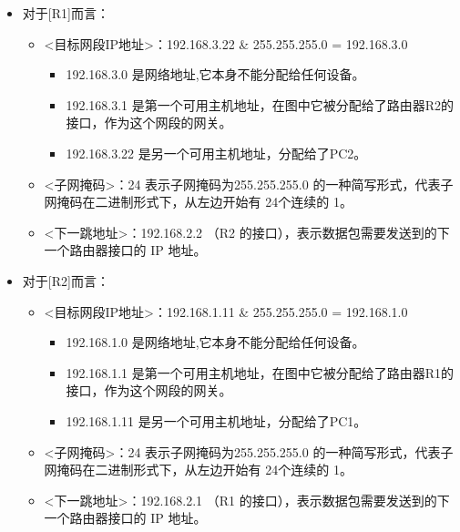 \documentclass[a4paper]{article}
\begin{document}
\begin{itemize}
    \item 对于[R1]而言：
    \begin{itemize}
        \item <目标网段IP地址>：192.168.3.22 \& 255.255.255.0 = 192.168.3.0
        \begin{itemize}
            \item 192.168.3.0 是网络地址,它本身不能分配给任何设备。
            \item 192.168.3.1 是第一个可用主机地址，在图中它被分配给了路由器R2的接口，作为这个网段的网关。
            \item 192.168.3.22 是另一个可用主机地址，分配给了PC2。
        \end{itemize}
        \item <子网掩码>：24 表示子网掩码为255.255.255.0 的一种简写形式，代表子网掩码在二进制形式下，从左边开始有 24个连续的 1。
        \item <下一跳地址>：192.168.2.2 （R2 的接口），表示数据包需要发送到的下一个路由器接口的 IP 地址。
    \end{itemize}
\end{itemize}   

\begin{itemize}
    \item 对于[R2]而言：
    \begin{itemize}
        \item <目标网段IP地址>：192.168.1.11 \& 255.255.255.0 = 192.168.1.0
        \begin{itemize}
            \item 192.168.1.0 是网络地址,它本身不能分配给任何设备。
            \item 192.168.1.1 是第一个可用主机地址，在图中它被分配给了路由器R1的接口，作为这个网段的网关。
            \item 192.168.1.11 是另一个可用主机地址，分配给了PC1。
        \end{itemize}
        \item <子网掩码>：24 表示子网掩码为255.255.255.0 的一种简写形式，代表子网掩码在二进制形式下，从左边开始有 24个连续的 1。
        \item <下一跳地址>：192.168.2.1 （R1 的接口），表示数据包需要发送到的下一个路由器接口的 IP 地址。
    \end{itemize}
\end{itemize}   

\vspace{1em}
\end{document}
